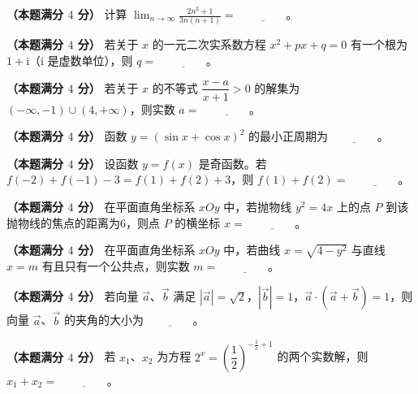 \begin{question}
\textbf{（本题满分 $4$ 分）} 计算 $\displaystyle\lim_{n\to\infty}\frac{2n^2+1}{3n(n+1)}=$ $\underline{\qquad\qquad}$。

\end{question}
\begin{question}
\textbf{（本题满分 $4$ 分）} 若关于 $x$ 的一元二次实系数方程 $x^2+px+q=0$ 有一个根为 $1+\mathrm{i}$（$\mathrm{i}$ 是虚数单位），则 $q=$ $\underline{\qquad\qquad}$。

\end{question}
\begin{question}
\textbf{（本题满分 $4$ 分）} 若关于 $x$ 的不等式 $\dfrac{x-a}{x+1}>0$ 的解集为 $(-\infty,-1)\cup(4,+\infty)$，则实数 $a=$ $\underline{\qquad\qquad}$。

\end{question}
\begin{question}
\textbf{（本题满分 $4$ 分）} 函数 $y=(\sin x+\cos x)^2$ 的最小正周期为 $\underline{\qquad\qquad}$。

\end{question}
\begin{question}
\textbf{（本题满分 $4$ 分）} 设函数 $y=f(x)$ 是奇函数。若 $f(-2)+f(-1)-3=f(1)+f(2)+3$，则 $f(1)+f(2)=$ $\underline{\qquad\qquad}$。

\end{question}
\begin{question}
\textbf{（本题满分 $4$ 分）} 在平面直角坐标系 $xOy$ 中，若抛物线 $y^2=4x$ 上的点 $P$ 到该抛物线的焦点的距离为6，则点 $P$ 的横坐标 $x=$ $\underline{\qquad\qquad}$。

\end{question}
\begin{question}
\textbf{（本题满分 $4$ 分）} 在平面直角坐标系 $xOy$ 中，若曲线 $x=\sqrt{4-y^2}$ 与直线 $x=m$ 有且只有一个公共点，则实数 $m=$ $\underline{\qquad\qquad}$。

\end{question}
\begin{question}
\textbf{（本题满分 $4$ 分）} 若向量 $\vec a$、$\vec b$ 满足 $|\vec a|=\sqrt2$，$|\vec b|=1$，$\vec a\cdot(\vec a+\vec b)=1$，则向量 $\vec a$、$\vec b$ 的夹角的大小为 $\underline{\qquad\qquad}$。

\end{question}
\begin{question}
\textbf{（本题满分 $4$ 分）} 若 $x_1$、$x_2$ 为方程 $2^x=\left(\dfrac12\right)^{-\frac1x+1}$ 的两个实数解，则 $x_1+x_2=$ $\underline{\qquad\qquad}$。

\end{question}
